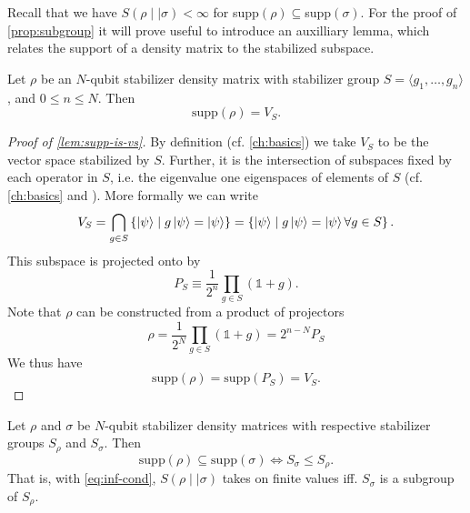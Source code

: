 Recall that we have $S(\rho\mid\mid\sigma)<\infty$ for
supp$(\rho)\subseteq$supp$(\sigma)$. For the proof of \cref{prop:subgroup} it
will prove useful to introduce an auxilliary lemma, which relates the support
of a density matrix to the stabilized subspace.
\begin{lem}\label{lem:supp-is-vs}
  Let $\rho$ be an $N$-qubit stabilizer density matrix with stabilizer group $S = \langle
  g_1, \ldots, g_n \rangle$, and $0\leq n \leq N$.
  Then \[ \mathrm{supp}(\rho) = V_{S}.\]
\end{lem}
\begin{proof}[Proof of \cref{lem:supp-is-vs}]
  By definition (cf. \cref{ch:basics}) we take $V_{S}$ to be the vector space
  stabilized by $S$.  Further, it is the intersection of subspaces fixed by
  each operator in $S$, i.e. the eigenvalue one eigenspaces of elements of $S$
  (cf.  \cref{ch:basics} and \cite{nielsenQuantumComputationQuantum2010}). More
  formally we can write
  \[ 
    V_S = \bigcap_{g \in S}  \left\{\ket{\psi} \mid g\ket{\psi} =
    \ket{\psi}\right\} = \left\{\ket{\psi} \mid g\ket{\psi} =
    \ket{\psi} \forall g \in S\right\}.
  \]
  This subspace is projected onto by
  \[ P_S \equiv \frac{1}{2^n} \prod_{g\in S} \left(\mathds{1} + g\right).\]
  Note that $\rho$ can be constructed from a product of projectors
  \cite{gottesmanStabilizerCodesQuantum1997}
  \[ \rho = \frac{1}{2^N} \prod_{g \in S} \left(\mathds{1} + g\right) = 2^{n-N} P_S \]
  We thus have
  \[ \mathrm{supp}(\rho) = \mathrm{supp}(P_S) = V_S. \]
\end{proof}

\begin{thm}\label{prop:subgroup}
  Let $\rho$ and $\sigma$ be $N$-qubit stabilizer density matrices with
  respective stabilizer groups $S_\rho$ and $S_\sigma$. Then
  \[ \mathrm{supp}(\rho)\subseteq \mathrm{supp}(\sigma) \Longleftrightarrow
  S_\sigma \leq S_\rho. \]
  That is, with \cref{eq:inf-cond}, $S(\rho\mid\mid\sigma)$ takes on finite values iff. $S_\sigma$ is a
  subgroup of $S_\rho$.
\end{thm}

